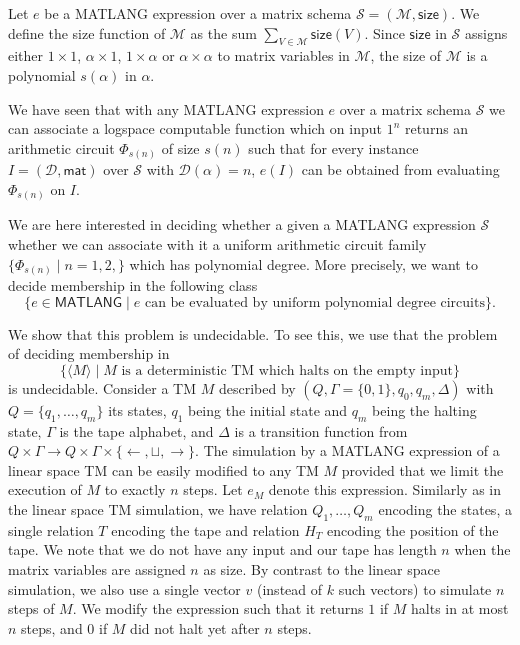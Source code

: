 
Let $e$ be a MATLANG expression over a matrix schema $\mathcal{S}=(\mathcal{M},\textsf{size})$.
We define the size function of $\mathcal{M}$ as the sum $\sum_{V\in\mathcal{M}} \textsf{size}(V)$. Since
$\textsf{size}$ in $\mathcal{S}$ assigns either $1\times 1$, $\alpha\times 1$, $1\times\alpha$ or $\alpha\times\alpha$ to matrix variables in $\mathcal{M}$, the size of $\mathcal{M}$ is a polynomial $s(\alpha)$ in $\alpha$. 

We have seen that with any MATLANG expression $e$ over a matrix schema $\mathcal{S}$ we can associate a logspace computable function which on input $1^n$ returns an arithmetic circuit $\Phi_{s(n)}$ of size $s(n)$ such that for every instance $I=(\mathcal{D},\textsf{mat})$ over $\mathcal{S}$ with $\mathcal{D}(\alpha)=n$, $e(I)$ can be obtained from evaluating $\Phi_{s(n)}$ on $I$. 

We are here interested in deciding whether a given a MATLANG expression $\mathcal{S}$ whether we can
associate with it a uniform arithmetic circuit family $\{\Phi_{s(n)}\mid n=1,2,\}$ which has polynomial degree. More precisely, we want to decide membership in the following class
$$
\{ e\in \mathsf{MATLANG}\mid \text{$e$ can be evaluated by uniform polynomial degree circuits}\}.
$$

We show that this problem is undecidable. To see this, we use that the problem of deciding membership
in 
$$
\{ \langle M\rangle\mid \text{$M$ is a deterministic TM which halts on the empty input}\}
$$
is undecidable. Consider a TM $M$ described by $(Q,\Gamma=\{0,1\},q_0,q_m,\Delta)$
with $Q=\{q_1,\ldots,q_m\}$ its states, $q_1$ being the initial state and $q_m$ being
the halting state, $\Gamma$ is the tape alphabet, and $\Delta$ is a transition function
from $Q\times \Gamma\to Q\times\Gamma\times \{\leftarrow,\sqcup,\rightarrow\}$. The 
simulation by a MATLANG expression of a linear space TM can be easily modified to
any TM $M$ provided that we limit the execution of $M$ to exactly $n$ steps. Let $e_M$ denote this expression. Similarly
as in the linear space TM simulation, we have relation $Q_1,\ldots,Q_m$ encoding the
states, a single relation $T$ encoding the tape and relation $H_T$ encoding the position
of the tape. We note that we do not have any input and our tape has length $n$ when the matrix variables are assigned $n$ as size. By contrast to the linear space 
simulation, we also use a single vector $v$ (instead of $k$ such vectors) 
to simulate $n$ steps of $M$. We modify the expression such that it returns $1$ if $M$
halts in at most $n$ steps, and $0$ if $M$ did not halt yet after $n$ steps.

